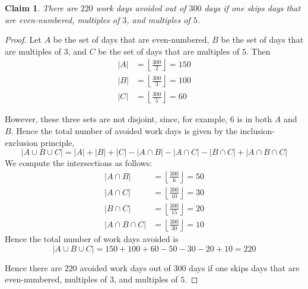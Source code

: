 \documentclass{article}
\newtheorem{claim}{Claim}
\begin{document}
\begin{claim}
    There are $220$ work days avoided out of $300$ days if one skips days that are even-numbered, 
    multiples of $3$, and multiples of $5$.
\end{claim}

\begin{proof}
    Let $A$ be the set of days that are even-numbered, $B$ be the set of days that are multiples of $3$, 
    and $C$ be the set of days that are multiples of $5$. Then
    \[
    \begin{aligned}
    |A| &= \left\lfloor \frac{300}{2} \right\rfloor = 150 \\
    |B| &= \left\lfloor \frac{300}{3} \right\rfloor = 100 \\
    |C| &= \left\lfloor \frac{300}{5} \right\rfloor = 60
    \end{aligned}
    \]

    \medskip

    However, these three sets are not disjoint, since, for example, $6$ is in both $A$ and $B$. Hence the 
    total number of avoided work days is given by the inclusion-exclusion principle,
    \[
    |A \cup B \cup C| = |A| + |B| + |C| - |A \cap B| - |A \cap C| - |B \cap C| + |A \cap B \cap C|
    \]
    We compute the intersections as follows:
    \[
    \begin{aligned}
    |A \cap B| &= \left\lfloor \frac{300}{6} \right\rfloor = 50 \\
    |A \cap C| &= \left\lfloor \frac{300}{10} \right\rfloor = 30 \\
    |B \cap C| &= \left\lfloor \frac{300}{15} \right\rfloor = 20 \\
    |A \cap B \cap C| &= \left\lfloor \frac{300}{30} \right\rfloor = 10
    \end{aligned}
    \]
    Hence the total number of work days avoided is
    \[
    |A \cup B \cup C| = 150 + 100 + 60 - 50 - 30 - 20 + 10 = 220
    \]

    \medskip

    Hence there are $220$ avoided work days out of $300$ days if one skips days that are even-numbered, 
    multiples of $3$, and multiples of $5$.
\end{proof}
\end{document}
